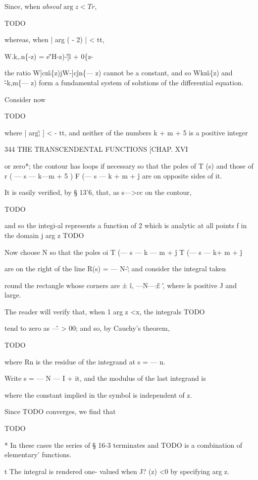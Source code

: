 Since, when $absval{\arg z} < Tr$,

TODO

whereas, when | arg ( - 2) | < tt,

W.k,.n\{-z) = e\^'H-z)-\^[l + 0\{z-%

the ratio W]c\^m\{z)jW-]c\^jn\{— z) cannot be a constant, and so
Wk\^m\{z) and \^-k,m\{— z) form a fundamental system of solutions of
the differential equation.


Consider now

TODO

where | arg\^; ] < - tt, and neither of the numbers k + m + 5 is a
positive integer

344 THE TRANSCENDENTAL FUNCTIONS [CHAP. XVI

or zero*; the contour has loops if necessary so that the poles of T
(s) and those of r ( — s — k—m + 5 ) F (— s — k + m + \^j are on
opposite sides of it.

It is easily verified, by § 13'6, that, as s—>cc on the contour,

TODO

and so the integi-al represents a function of 2 which is analytic at
all points f in the domain j arg z TODO

Now choose N so that the poles oi T (— s — k — m + \^j T (— s — k+ m +
\^j

are on the right of the line R(s) = — N-\^; and consider the integral
taken

round the rectangle whose corners are ± \^i, —N—\^± \^, where \^ is
positive J and large.

The reader will verify that, when 1 arg z <x, the integrals TODO

tend to zero as \^— > 00; and so, by Cauchy's theorem,

TODO

where Rn is the residue of the integrand at s = — n.

Write s = — N — I + it, and the modulus of the last integrand is

where the constant implied in the symbol is independent of z.

Since TODO converges, we find that

TODO

* In these cases the series of § 16-3 terminates and TODO is a
combination of elementary' functions.

t The integral is rendered one- valued when J? (z) <0 by specifying
arg z.

